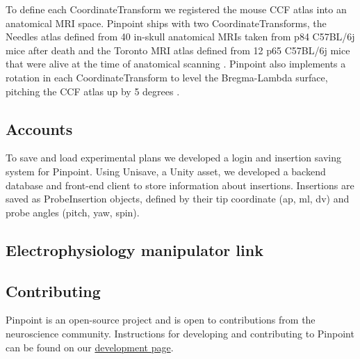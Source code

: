To define each CoordinateTransform we registered the mouse CCF \citep{wang2020allen} atlas into an anatomical MRI space. Pinpoint ships with two CoordinateTransforms, the Needles atlas defined from 40 in-skull anatomical MRIs taken from p84 C57BL/6j mice after death \citep{dorr2008high} and the Toronto MRI atlas defined from 12 p65 C57BL/6j mice that were alive at the time of anatomical scanning \citep{qiu2018mouse}. Pinpoint also implements a rotation in each CoordinateTransform to level the Bregma-Lambda surface, pitching the CCF atlas up by 5 degrees \citep{international2022reproducibility}. 

\subsection{Accounts}

To save and load experimental plans we developed a login and insertion saving system for Pinpoint. Using Unisave, a Unity asset, we developed a backend database and front-end client to store information about insertions. Insertions are saved as ProbeInsertion objects, defined by their tip coordinate (ap, ml, dv) and probe angles (pitch, yaw, spin). 

\subsection{Electrophysiology manipulator link}

\subsection{Contributing}

Pinpoint is an open-source project and is open to contributions from the neuroscience community. Instructions for developing and contributing to Pinpoint can be found on our \href{https://virtualbrainlab.org/pinpoint/development.html}{development page}.
